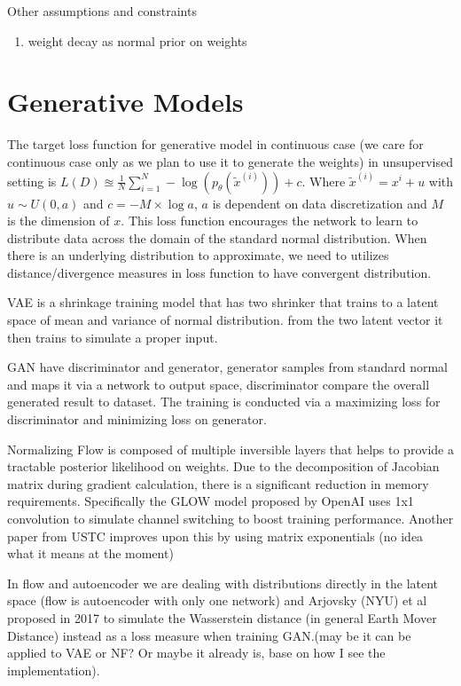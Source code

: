 \documentclass[honours,12pt]{unswthesis}
\numberwithin{equation}{section}
\begin{document}
Other assumptions and constraints
\begin{enumerate}
\item weight decay as normal prior on weights
\end{enumerate}
    
\section{Generative Models}

The target loss function for generative model in continuous case (we care for continuous case only as we plan to use it to generate the weights) in unsupervised setting is $L(D) \approxeq \frac{1}{N}\sum_{i=1}^N - \log(p_\theta(\tilde{x}^{(i)}))+c$. Where $\tilde{x}^{(i)} = x^{i}+u$ with $u\sim U(0,a)$ and $c=-M\times \log{a}$, $a$ is dependent on data discretization and $M$ is the dimension of $x$. This loss function encourages the network to learn to distribute data across the domain of the standard normal distribution. When there is an underlying distribution to approximate, we need to utilizes distance/divergence measures in loss function to have convergent distribution.

VAE is a shrinkage training model that has two shrinker that trains to a latent space of mean and variance of normal distribution.
from the two latent vector it then trains to simulate a proper input.

GAN have discriminator and generator, generator samples from standard normal and maps it via a network to output space, discriminator compare the overall generated result to dataset. The training is conducted via a maximizing loss for discriminator and minimizing loss on generator.

Normalizing Flow is composed of multiple inversible layers that helps to provide a tractable posterior likelihood on weights. Due to the decomposition of Jacobian matrix during gradient calculation, there is a significant reduction in memory requirements. Specifically the GLOW model proposed by OpenAI \cite{openai2018glow} uses 1x1 convolution to simulate channel switching to boost training performance. Another paper from USTC improves upon this by using matrix exponentials (no idea what it means at the moment)

In flow and autoencoder we are dealing with distributions directly in the latent space (flow is autoencoder with only one network) and Arjovsky (NYU) \cite{PMLR2017_WGAN} et al proposed in 2017 to simulate the Wasserstein distance (in general Earth Mover Distance) instead as a loss measure when training GAN.(may be it can be applied to VAE or NF? Or maybe it already is, base on how I see the implementation). 
\end{document}
